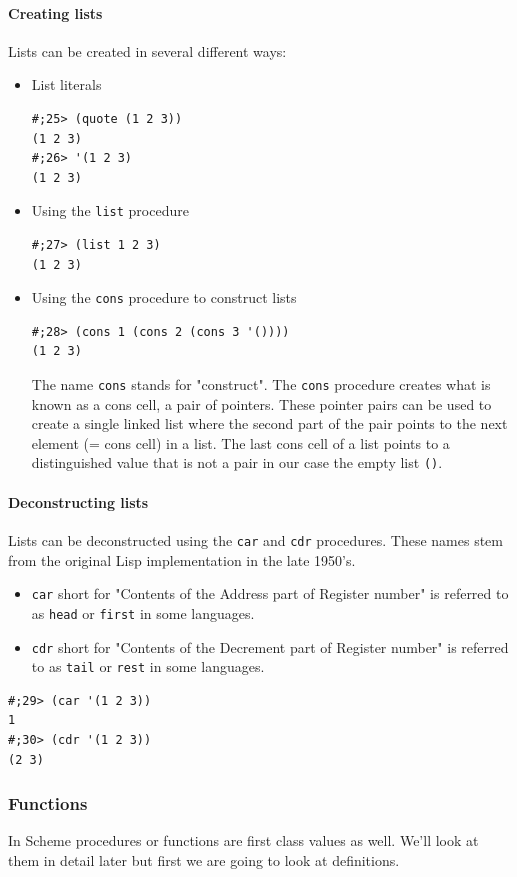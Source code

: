 \documentclass[12pt,a4paper,english,twoside]{article}
\begin{document}
\paragraph{Creating lists}
Lists can be created in several different ways:
\begin{itemize}
\item List literals \begin{lstlisting}
#;25> (quote (1 2 3))
(1 2 3)
#;26> '(1 2 3)
(1 2 3)
\end{lstlisting}
\item Using the \texttt{list} procedure
\begin{lstlisting}
#;27> (list 1 2 3)
(1 2 3)
\end{lstlisting}
\item Using the \texttt{cons} procedure to construct lists  \begin{lstlisting}
#;28> (cons 1 (cons 2 (cons 3 '())))
(1 2 3)
\end{lstlisting}
The name \texttt{cons} stands for "construct". The \texttt{cons} procedure 
creates what is known as a cons cell, a pair of pointers. These pointer pairs 
can be used to create a single linked list where the second part of the pair 
points to the next element (= cons cell) in a list. The last cons cell of a 
list points to a distinguished value that is not a pair in our case the empty 
list \texttt{()}.  \end{itemize}
\paragraph{Deconstructing lists}
Lists can be deconstructed using the \texttt{car} and \texttt{cdr} procedures. 
These names stem from the original Lisp implementation in the late 1950's.  
\begin{itemize}
\item \texttt{car} short for "Contents of the Address part of Register number" 
  is referred to as \texttt{head} or \texttt{first} in some languages.
\item \texttt{cdr} short for "Contents of the Decrement part of Register 
  number" is referred to as \texttt{tail} or \texttt{rest} in some languages.
\end{itemize} \begin{lstlisting}
#;29> (car '(1 2 3))
1
#;30> (cdr '(1 2 3))
(2 3)
\end{lstlisting}
\subsubsection{Functions}
In Scheme procedures or functions are first class values as well. We'll look at 
them in detail later but first we are going to look at definitions.
\end{document}

